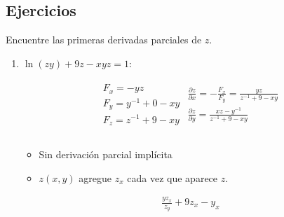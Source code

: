 \subsection{Ejercicios}
Encuentre las primeras derivadas parciales de $z$.
\begin{enumerate}
    \item $\ln(zy)+9z-xyz = 1 $:
        \begin{center}
           \begin{align*}
               \begin{matrix}
                   F_x = -yz \\ 
                   F_y = y^{-1}+0-xy \\ 
                   F_z = z^{-1}+9-xy \\ 
               \end{matrix}
               \begin{matrix}
                   \frac{\partial z}{\partial x} = -\frac{F_x}{F_y} = \frac{yz}{z^{-1}+9-xy} \\ 
                   \frac{\partial z}{\partial y} = \frac{xz-y^{-1}}{z^{-1}+9-xy} \\    
               \end{matrix} \\ 
           \end{align*}
        \begin{itemize}[label=\#]
            \item Sin derivación parcial implícita
            \item $z(x,y)$ agregue $z_x$ cada vez que aparece $z$.
        \end{itemize}
        \begin{align*}
            \frac{yz_x}{z_y} + 9 z_x - y_x
        \end{align*}
        \end{center}
\end{enumerate}


















